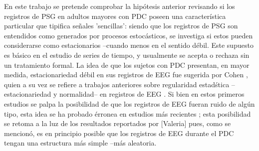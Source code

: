 \documentclass[12pt,a4paper]{mitthesis}
\begin{document}
En este trabajo se pretende comprobar la hip\'otesis anterior revisando si los registros de PSG en 
adultos mayores con PDC poseen una caracter\'istica particular que tipifica se\~nales 'sencillas': 
siendo que los registros de PSG son entendidos como generados por procesos estoc\'asticos, se 
investiga si estos pueden considerarse como estacionarios --cuando menos en el sentido d\'ebil.
Este supuesto es b\'asico en el estudio de series de tiempo, y usualmente se acepta o rechaza sin 
un tratamiento formal.
La idea de que los sujetos con PDC presentan, en mayor medida, estacionariedad d\'ebil en sus 
registros de EEG fue sugerida por Cohen \cite{Cohen77}, quien a su vez se refiere a trabajos 
anteriores sobre regularidad estad\'stica --estacionariedad y normalidad-- en registros de EEG \cite{McEwen75,Sugimoto78,Kawabata73}. 
Si bien en estos primeros estudios se palpa la posibilidad de que los registros de EEG fueran
ruido de alg\'un tipo, esta idea se ha probado \'erronea en estudios m\'as recientes 
\cite{Klonowski09}; esta posibilidad se retoma a la luz de los resultados reportados por
[Valeria] pues, como se mencion\'o, es en principio posible que los registros de EEG durante el 
PDC tengan una estructura m\'as simple --m\'as aleatoria.

\end{document}
